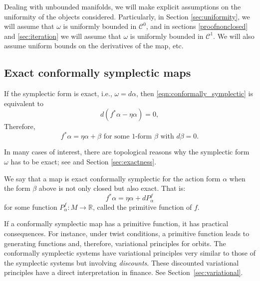 \documentclass[11pt]{amsart}
\theoremstyle{definition}
\theoremstyle{remark}
\numberwithin{equation}{section}
\newcommand{\C}{\mathcal{C}}
\begin{document}
Dealing with unbounded manifolds, we will make explicit assumptions on the uniformity of the objects considered.
Particularly, in Section \ref{sec:uniformity}, we will assume that $\omega$ is uniformly bounded in $\C^0$, and
in sections \ref{proofnonclosed} and \ref{sec:iteration} we will assume that $\omega$ is uniformly bounded in $\C^1$.
We will also assume uniform bounds on the derivatives of the map, etc.

\subsection{Exact conformally symplectic maps}

If the symplectic form is exact,  i.e., $\omega=d\alpha$,   then \eqref{eqn:conformally_symplectic}
is equivalent to
\[
d(f^*\alpha-\eta\alpha)=0,
\]
Therefore,
\begin{equation*}\label{conf-symplectic}
 f^* \alpha = \eta \alpha + \beta \textrm{ for some $1$-form $\beta$ with } d\beta  = 0 .
\end{equation*}



In many cases of interest, there are topological
reasons why the symplectic form $\omega$  has  to be
exact; see \cite{ArnaudF24} and Section  \ref{sec:exactness}.

We say that a   map is exact conformally symplectic for the action form $\alpha$ when
the form $\beta$ above is not only closed but also exact. That is:
\begin{equation}\label{eqn:exact_conformally_symplectic}
  f^*\alpha=\eta\alpha+dP^f_\alpha
\end{equation}
for some function $P^f_\alpha:M\to\mathbb{R}$, called the primitive function of $f$.

If a conformally symplectic map has a primitive function, it has
practical consequences.
For instance, under twist conditions, a primitive function
leads  to generating functions and, therefore, variational principles for orbits.
The conformally symplectic systems
have variational principles very similar
to those of the symplectic systems but involving
\emph{discounts}. These discounted variational principles
have a direct interpretation  in finance.  See
Section~\ref{sec:variational}.
\end{document}
